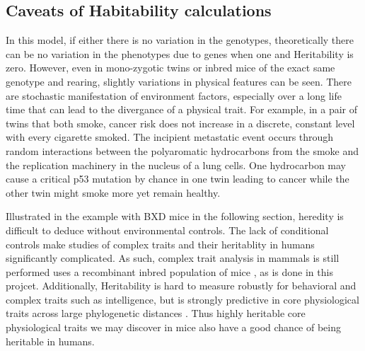 \documentclass[a4paper]{book}
\begin{document}
\subsection*{Caveats of Habitability calculations}
	
In this model, if either there is no variation in the genotypes, theoretically there can be no variation in the phenotypes due to genes when one and Heritability is zero. However, even in mono-zygotic twins or inbred mice of the exact same genotype and rearing, slightly variations in physical features can be seen. There are stochastic manifestation of environment factors, especially over a long life time that can lead to the divergance of a physical trait\citep{Czyz2012Geneticdifferences}. For example, in a pair of twins that both smoke, cancer risk does not increase in a discrete, constant level with every cigarette smoked. The incipient metastatic event occurs through random interactions between the polyaromatic hydrocarbons from the smoke and the replication machinery in the nucleus of a lung cells. One hydrocarbon may cause a critical p53 mutation by chance in one twin leading to cancer while the other twin might smoke more yet remain healthy.
	
	Illustrated in the example with BXD mice in the following section, heredity is difficult to deduce without environmental controls. The lack of conditional controls make studies of complex traits and their heritablity in humans significantly complicated. As such, complex trait analysis in mammals is still performed uses a recombinant inbred population of mice \citep{Williams2015TheAnalysis}, as is done in this projcet. Additionally, Heritability is hard to measure robustly for behavioral and complex traits such as intelligence, but is strongly predictive in core physiological traits across large phylogenetic distances \citep{Falconer1996IntroductionGenetics}. Thus highly heritable core physiological traits we may discover in mice also have a good chance of being heritable in humans.
	
\end{document}
